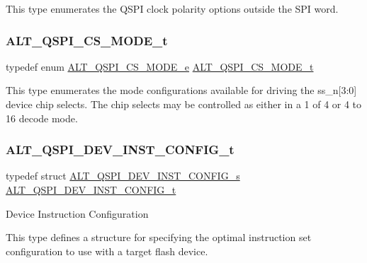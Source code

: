 This type enumerates the Q\+S\+PI clock polarity options outside the S\+PI word. \mbox{\label{group__ALT__QSPI__DEV__CFG_gaffe96455cbf44fb3adb844c576c045fe}} 
\subsubsection{\texorpdfstring{ALT\_QSPI\_CS\_MODE\_t}{ALT\_QSPI\_CS\_MODE\_t}}
{\footnotesize\ttfamily typedef enum \mbox{\hyperlink{group__ALT__QSPI__DEV__CFG_ga1963b85b7d2bbc2e56ba43d807c9c1b0}{A\+L\+T\+\_\+\+Q\+S\+P\+I\+\_\+\+C\+S\+\_\+\+M\+O\+D\+E\+\_\+e}}  \mbox{\hyperlink{group__ALT__QSPI__DEV__CFG_gaffe96455cbf44fb3adb844c576c045fe}{A\+L\+T\+\_\+\+Q\+S\+P\+I\+\_\+\+C\+S\+\_\+\+M\+O\+D\+E\+\_\+t}}}

This type enumerates the mode configurations available for driving the ss\+\_\+n\mbox{[}3\+:0\mbox{]} device chip selects. The chip selects may be controlled as either in a \textquotesingle{}1 of 4\textquotesingle{} or \textquotesingle{}4 to 16 decode\textquotesingle{} mode. \mbox{\label{group__ALT__QSPI__DEV__CFG_ga56516b11d66633580f54d1cc69c7aa8e}} 
\subsubsection{\texorpdfstring{ALT\_QSPI\_DEV\_INST\_CONFIG\_t}{ALT\_QSPI\_DEV\_INST\_CONFIG\_t}}
{\footnotesize\ttfamily typedef struct \mbox{\hyperlink{structALT__QSPI__DEV__INST__CONFIG__s}{A\+L\+T\+\_\+\+Q\+S\+P\+I\+\_\+\+D\+E\+V\+\_\+\+I\+N\+S\+T\+\_\+\+C\+O\+N\+F\+I\+G\+\_\+s}}  \mbox{\hyperlink{group__ALT__QSPI__DEV__CFG_ga56516b11d66633580f54d1cc69c7aa8e}{A\+L\+T\+\_\+\+Q\+S\+P\+I\+\_\+\+D\+E\+V\+\_\+\+I\+N\+S\+T\+\_\+\+C\+O\+N\+F\+I\+G\+\_\+t}}}

Device Instruction Configuration

This type defines a structure for specifying the optimal instruction set configuration to use with a target flash device. \mbox{\label{group__ALT__QSPI__DEV__CFG_gaeeacf956659047dac90f9dde87817817}} 
